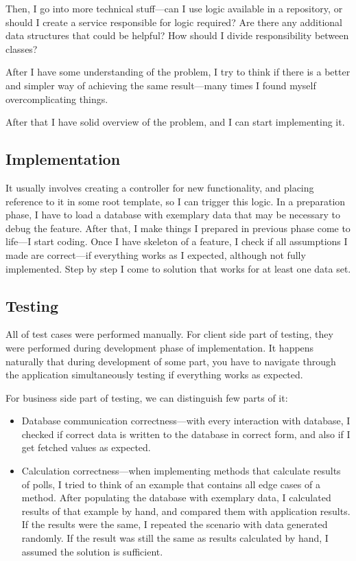 \documentclass[a4paper,twoside,12pt]{book}
\begin{document}
        Then, I go into more technical stuff---can I use logic available in a repository, or should I create a service responsible for logic required?
        Are there any additional data structures that could be helpful?
        How should I divide responsibility between classes?

        After I have some understanding of the problem, I try to think if there is a better and simpler way of achieving the same result---many times I found myself overcomplicating things.

        After that I have solid overview of the problem, and I can start implementing it.

      \subsection{Implementation}
        It usually involves creating a controller for new functionality, and placing reference to it in some root template, so I can trigger this logic.
        In a preparation phase, I have to load a database with exemplary data that may be necessary to debug the feature.
        After that, I make things I prepared in previous phase come to life---I start coding.
        Once I have skeleton of a feature, I check if all assumptions I made are correct---if everything works as I expected, although not fully implemented.
        Step by step I come to solution that works for at least one data set.
        
      \subsection{Testing}
        All of test cases were performed manually.
        For client side part of testing, they were performed during development phase of implementation.
        It happens naturally that during development of some part, you have to navigate through the application simultaneously testing if everything works as expected.

        For business side part of testing, we can distinguish few parts of it:
        \begin{itemize}
          \item Database communication correctness---with every interaction with database, I checked if correct data is written to the database in correct form,
          and also if I get fetched values as expected.
          \item Calculation correctness---when implementing methods that calculate results of polls, I tried to think of an example that contains all edge cases of a method.
          After populating the database with exemplary data, I calculated results of that example by hand, and compared them with application results.
          If the results were the same, I repeated the scenario with data generated randomly. 
          If the result was still the same as results calculated by hand, I assumed the solution is sufficient.
        \end{itemize}
\end{document}
